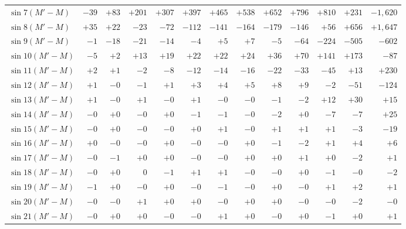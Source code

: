 \begin{landscape}
\begin{longtable}{@{}l|r|r|r|r|r|r|r|r|r|r|r|r@{}}
\(\sin 7(M'-M)\) & \(-39\) & \(+83\) & \(+201\) & \(+307\) & \(+397\) & \(+465\) & \(+538\) & \(+652\) & \(+796\) & \(+810\) & \(+231\) & \(-1{,}620\)\\
\(\sin 8(M'-M)\) & \(+35\) & \(+22\) & \(-23\) & \(-72\) & \(-112\) & \(-141\) & \(-164\) & \(-179\) & \(-146\) & \(+56\) & \(+656\) & \(+1{,}647\)\\
\(\sin 9(M'-M)\) & \(-1\) & \(-18\) & \(-21\) & \(-14\) & \(-4\) & \(+5\) & \(+7\) & \(-5\) & \(-64\) & \(-224\) & \(-505\) & \(-602\)\\
\(\sin 10(M'-M)\) & \(-5\) & \(+2\) & \(+13\) & \(+19\) & \(+22\) & \(+22\) & \(+24\) & \(+36\) & \(+70\) & \(+141\) & \(+173\) & \(-87\)\\
\(\sin 11(M'-M)\) & \(+2\) & \(+1\) & \(-2\) & \(-8\) & \(-12\) & \(-14\) & \(-16\) & \(-22\) & \(-33\) & \(-45\) & \(+13\) & \(+230\)\\
\(\sin 12(M'-M)\) & \(+1\) & \(-0\) & \(-1\) & \(+1\) & \(+3\) & \(+4\) & \(+5\) & \(+8\) & \(+9\) & \(-2\) & \(-51\) & \(-124\)\\
\(\sin 13(M'-M)\) & \(+1\) & \(-0\) & \(+1\) & \(-0\) & \(+1\) & \(-0\) & \(-0\) & \(-1\) & \(-2\) & \(+12\) & \(+30\) & \(+15\)\\
\(\sin 14(M'-M)\) & \(-0\) & \(+0\) & \(-0\) & \(+0\) & \(-1\) & \(-1\) & \(-0\) & \(-2\) & \(+0\) & \(-7\) & \(-7\) & \(+25\)\\
\(\sin 15(M'-M)\) & \(-0\) & \(+0\) & \(-0\) & \(-0\) & \(+0\) & \(+1\) & \(-0\) & \(+1\) & \(+1\) & \(+1\) & \(-3\) & \(-19\)\\
\(\sin 16(M'-M)\) & \(+0\) & \(-0\) & \(-0\) & \(+0\) & \(-0\) & \(-0\) & \(+0\) & \(-1\) & \(-2\) & \(+1\) & \(+4\) & \(+6\)\\
\(\sin 17(M'-M)\) & \(-0\) & \(-1\) & \(+0\) & \(+0\) & \(-0\) & \(-0\) & \(+0\) & \(+0\) & \(+1\) & \(+0\) & \(-2\) & \(+1\)\\
\(\sin 18(M'-M)\) & \(-0\) & \(+0\) & \(0\) & \(-1\) & \(+1\) & \(+1\) & \(-0\) & \(-0\) & \(+0\) & \(-1\) & \(-0\) & \(-2\)\\
\(\sin 19(M'-M)\) & \(-1\) & \(+0\) & \(-0\) & \(+0\) & \(-0\) & \(-1\) & \(-0\) & \(+0\) & \(-0\) & \(+1\) & \(+2\) & \(+1\)\\
\(\sin 20(M'-M)\) & \(-0\) & \(-0\) & \(+1\) & \(+0\) & \(+0\) & \(-0\) & \(+0\) & \(+0\) & \(-0\) & \(-0\) & \(-2\) & \(-0\)\\
\(\sin 21(M'-M)\) & \(-0\) & \(+0\) & \(+0\) & \(-0\) & \(-0\) & \(+1\) & \(+0\) & \(-0\) & \(+0\) & \(-1\) & \(+0\) & \(+1\)\\

\end{longtable}
\end{landscape}
